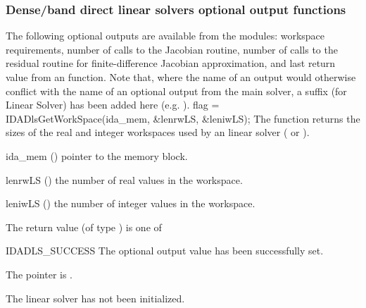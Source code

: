 {%
\subsubsection{Dense/band direct linear solvers optional output functions}
\label{sss:optout_dls}
The following optional outputs are available from the {\idadls} modules:
workspace requirements, number of calls to the Jacobian routine, number of 
calls to the residual routine for finite-difference Jacobian approximation,
and last return value from an {\idadls} function.
Note that, where the name of an output would otherwise conflict with
the name of an optional output from the main solver, a suffix 
(for Linear Solver) has been added here (e.g.  ).
{
  flag = IDADlsGetWorkSpace(ida\_mem, \&lenrwLS, \&leniwLS);
}
{
  The function  returns the sizes of the real and
  integer workspaces used by an {\idadls} linear solver ({\idadense} or
  {\idaband}). 
}
{
  \begin{args}
  \item[ida\_mem] ()
    pointer to the {\idas} memory block.
  \item[lenrwLS] ()
    the number of real values in the {\idadls} workspace.
  \item[leniwLS] ()
    the number of integer values in the {\idadls} workspace.
  \end{args}
}
{
  The return value  (of type ) is one of
  \begin{args}
  \item[IDADLS\_SUCCESS] 
    The optional output value has been successfully set.
  \item[\Id{IDADLS\_MEM\_NULL}]
    The  pointer is .
  \item[\Id{IDADLS\_LMEM\_NULL}]
    The {\idadls} linear solver has not been initialized.
  \end{args}
}}
